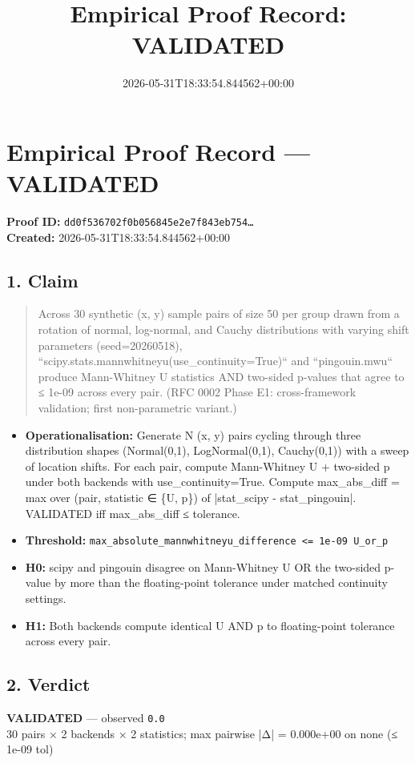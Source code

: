 \documentclass{article}
\title{Empirical Proof Record: VALIDATED}
\date{2026-05-31T18:33:54.844562+00:00}
\begin{document}
\maketitle
\section*{Empirical Proof Record --- \textcolor{validated}{\textbf{VALIDATED}}}
\textbf{Proof ID:} \texttt{dd0f536702f0b056845e2e7f843eb754\dots}\\
\textbf{Created:} 2026-05-31T18:33:54.844562+00:00
\subsection*{1. Claim}
\begin{quote}Across 30 synthetic (x, y) sample pairs of size 50 per group drawn from a rotation of normal, log-normal, and Cauchy distributions with varying shift parameters (seed=20260518), ``scipy.stats.mannwhitneyu(use\_continuity=True)`` and ``pingouin.mwu`` produce Mann-Whitney U statistics AND two-sided p-values that agree to ≤ 1e-09 across every pair. (RFC 0002 Phase E1: cross-framework validation; first non-parametric variant.)\end{quote}
\begin{itemize}
\item \textbf{Operationalisation:} Generate N (x, y) pairs cycling through three distribution shapes (Normal(0,1), LogNormal(0,1), Cauchy(0,1)) with a sweep of location shifts. For each pair, compute Mann-Whitney U + two-sided p under both backends with use\_continuity=True. Compute max\_abs\_diff = max over (pair, statistic ∈ \{U, p\}) of |stat\_scipy - stat\_pingouin|. VALIDATED iff max\_abs\_diff ≤ tolerance.
\item \textbf{Threshold:} \texttt{max\_absolute\_mannwhitneyu\_difference <= 1e-09 U\_or\_p}
\item \textbf{H0:} scipy and pingouin disagree on Mann-Whitney U OR the two-sided p-value by more than the floating-point tolerance under matched continuity settings.
\item \textbf{H1:} Both backends compute identical U AND p to floating-point tolerance across every pair.
\end{itemize}
\subsection*{2. Verdict}
\textcolor{validated}{\textbf{VALIDATED}} --- observed \texttt{0.0}\\
30 pairs × 2 backends × 2 statistics; max pairwise |Δ| = 0.000e+00 on none (≤ 1e-09 tol)
\end{document}
